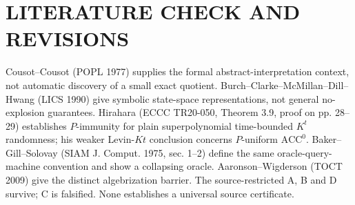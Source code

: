 \documentclass[11pt]{article}
\begin{document}
\section{LITERATURE CHECK AND REVISIONS}
Cousot--Cousot (POPL 1977) supplies the formal abstract-interpretation context, not automatic discovery of a small exact quotient. Burch--Clarke--McMillan--Dill--Hwang (LICS 1990) give symbolic state-space representations, not general no-explosion guarantees. Hirahara (ECCC TR20-050, Theorem 3.9, proof on pp. 28--29) establishes $P$-immunity for plain superpolynomial time-bounded $K^t$ randomness; his weaker Levin-$Kt$ conclusion concerns $P$-uniform $\mathrm{ACC}^0$. Baker--Gill--Solovay (SIAM J. Comput. 1975, sec. 1--2) define the same oracle-query-machine convention and show a collapsing oracle. Aaronson--Wigderson (TOCT 2009) give the distinct algebrization barrier. The source-restricted A, B and D survive; C is falsified. None establishes a universal source certificate.
\end{document}
